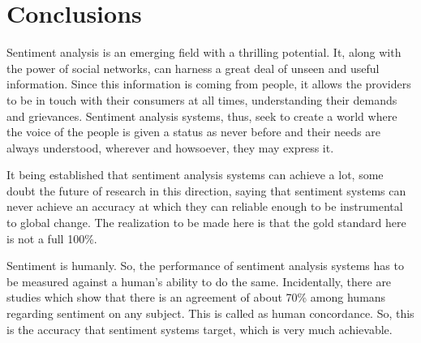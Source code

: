 \chapter*{Conclusions}

Sentiment analysis is an emerging field with a thrilling potential. It, along with the power of social networks, can harness a great deal of unseen and useful information.
Since this information is coming from people, it allows the providers to be in touch with their consumers at all times, understanding their demands and grievances.
Sentiment analysis systems, thus, seek to create a world where the voice of the people is given a status as never before and their needs are always understood, wherever
and howsoever, they may express it.

\vspace{8mm}

It being established that sentiment analysis systems can achieve a lot, some doubt the future of research in this direction, saying that sentiment systems can never 
achieve an accuracy at which they can reliable enough to be instrumental to global change. The realization to be made here is that the gold standard here is not a full 100\%.

\vspace{8mm}

Sentiment is humanly. So, the performance of sentiment analysis systems has to be measured against a human's ability to do the same. Incidentally, there are studies which
show that there is an agreement of about 70\% among humans regarding sentiment on any subject. This is called as human concordance. So, this is the accuracy that sentiment systems 
target, which is very much achievable.


\vfill